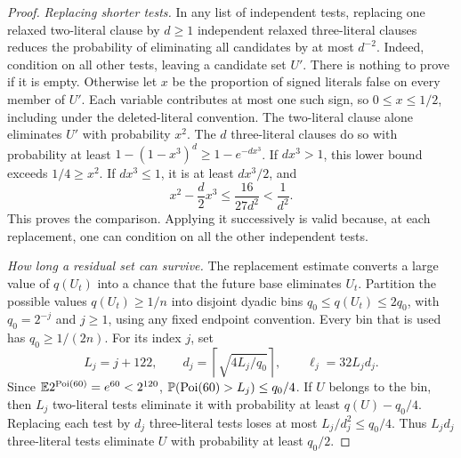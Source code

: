 \begin{proof}
\emph{Replacing shorter tests.}
In any list of
independent tests, replacing one relaxed two-literal clause by $d\ge1$
independent relaxed three-literal clauses reduces the probability of
eliminating all candidates by at most $d^{-2}$. Indeed, condition on all
other tests, leaving a candidate set $U'$. There is nothing to prove if it
is empty. Otherwise let $x$ be the proportion of signed literals false on
every member of $U'$. Each variable contributes at most one such sign, so
$0\le x\le1/2$, including under the deleted-literal convention. The
two-literal clause alone eliminates $U'$ with probability $x^2$. The $d$
three-literal clauses do so with probability at least
$1-(1-x^3)^d\ge1-e^{-dx^3}$. If $dx^3>1$, this lower bound exceeds
$1/4\ge x^2$. If $dx^3\le1$, it is at least $dx^3/2$, and
\[
 x^2-\frac d2x^3\le\frac{16}{27d^2}<\frac1{d^2}.
\]
This proves the comparison. Applying it successively is valid because,
at each replacement, one can condition on all the other independent tests.

\emph{How long a residual set can survive.}
The replacement estimate converts a large value of $q(U_t)$ into a
chance that the future base eliminates $U_t$. Partition the possible
values $q(U_t)\ge1/n$ into disjoint dyadic bins
$q_0\le q(U_t)\le2q_0$, with $q_0=2^{-j}$ and $j\ge1$, using any
fixed endpoint convention. Every bin that is used has $q_0\ge1/(2n)$.
For its index $j$, set
\begin{equation}\label{cp:bin-parameters}
 L_j=j+122,\qquad
 d_j=\left\lceil\sqrt{4L_j/q_0}\right\rceil,\qquad
 \ell_j=32L_jd_j.
\end{equation}
Since $\mathbb E2^{\operatorname{Poi}(60)}=e^{60}<2^{120}$,
$\mathbb P(\operatorname{Poi}(60)>L_j)\le q_0/4$. If $U$ belongs to the bin, then
$L_j$ two-literal tests eliminate it with probability at least
$q(U)-q_0/4$. Replacing each test by $d_j$ three-literal tests loses at
most $L_j/d_j^2\le q_0/4$. Thus $L_jd_j$ three-literal tests eliminate
$U$ with probability at least $q_0/2$.


\end{proof}
